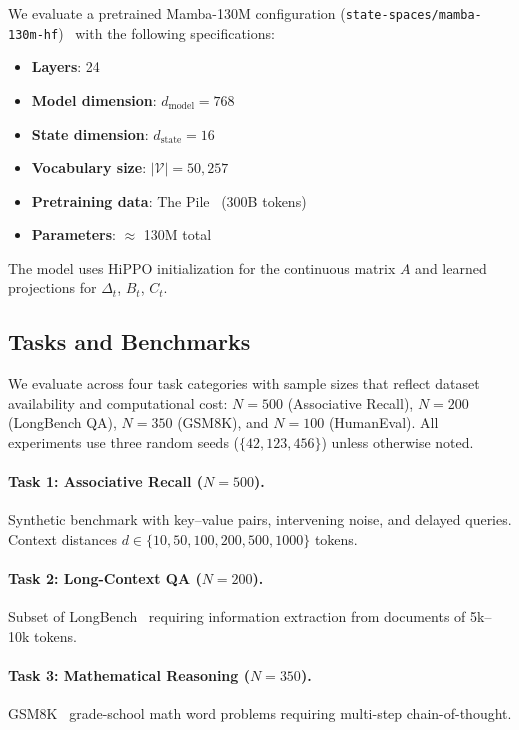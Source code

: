 \documentclass[10pt,twocolumn]{article}
\begin{document}
We evaluate a pretrained Mamba-130M configuration (\texttt{state-spaces/mamba-130m-hf})~\cite{gu2023mamba} with the following specifications:
\begin{itemize}
\item \textbf{Layers}: 24
\item \textbf{Model dimension}: $d_{\text{model}} = 768$
\item \textbf{State dimension}: $d_{\text{state}} = 16$
\item \textbf{Vocabulary size}: $|\mathcal{V}| = 50{,}257$
\item \textbf{Pretraining data}: The Pile~\cite{gao2020pile} (300B tokens)
\item \textbf{Parameters}: $\approx$ 130M total
\end{itemize}

The model uses HiPPO initialization for the continuous matrix $A$ and learned projections for $\Delta_t$, $B_t$, $C_t$.

\subsection{Tasks and Benchmarks}

We evaluate across four task categories with sample sizes that reflect dataset availability and computational cost: $N{=}500$ (Associative Recall), $N{=}200$ (LongBench QA), $N{=}350$ (GSM8K), and $N{=}100$ (HumanEval). All experiments use three random seeds ($\{42, 123, 456\}$) unless otherwise noted.

\paragraph{Task 1: Associative Recall ($N{=}500$).}
Synthetic benchmark with key--value pairs, intervening noise, and delayed queries. Context distances $d \in \{10, 50, 100, 200, 500, 1000\}$ tokens.

\paragraph{Task 2: Long-Context QA ($N{=}200$).}
Subset of LongBench~\cite{bai2023longbench} requiring information extraction from documents of 5k--10k tokens.

\paragraph{Task 3: Mathematical Reasoning ($N{=}350$).}
GSM8K~\cite{cobbe2021training} grade-school math word problems requiring multi-step chain-of-thought.
\end{document}
